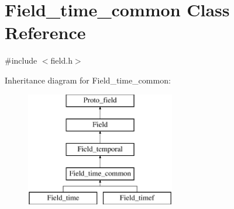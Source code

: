 \hypertarget{classField__time__common}{}\section{Field\+\_\+time\+\_\+common Class Reference}
\label{classField__time__common}


{\ttfamily \#include $<$field.\+h$>$}

Inheritance diagram for Field\+\_\+time\+\_\+common\+:\begin{figure}[H]
\begin{center}
\leavevmode
\includegraphics[height=5.000000cm]{classField__time__common}
\end{center}
\end{figure}

